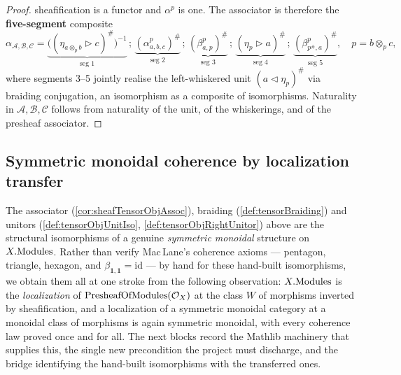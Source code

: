 \begin{proof}
  sheafification is a functor and \(\alpha^p\) is one. The associator is therefore
  the \textbf{five-segment} composite
  \[
    \alpha_{\mathcal{A},\mathcal{B},\mathcal{C}}
      = \underbrace{\bigl((\eta_{a \otimes_p b} \rhd c)^{\#}\bigr)^{-1}}_{\text{seg }1}
        \,;\, \underbrace{(\alpha^p_{a,b,c})^{\#}}_{\text{seg }2}
        \,;\, \underbrace{(\beta^p_{a,p})^{\#}}_{\text{seg }3}
        \,;\, \underbrace{(\eta_{p} \rhd a)^{\#}}_{\text{seg }4}
        \,;\, \underbrace{(\beta^p_{p^{\#},a})^{\#}}_{\text{seg }5},
    \quad p = b \otimes_p c,
  \]
  where segments 3--5 jointly realise the left-whiskered unit
  \((a \lhd \eta_{p})^{\#}\) via braiding conjugation,
  an isomorphism as a composite of isomorphisms. Naturality in
  \(\mathcal{A}, \mathcal{B}, \mathcal{C}\) follows from naturality of the unit,
  of the whiskerings, and of the presheaf associator.
\end{proof}

\subsection{Symmetric monoidal coherence by localization transfer}
\label{sec:sgr_localized_monoidal}

The associator (\cref{cor:sheafTensorObjAssoc}), braiding (\cref{def:tensorBraiding})
and unitors (\cref{def:tensorObjUnitIso}, \cref{def:tensorObjRightUnitor}) above are
the structural isomorphisms of a genuine \emph{symmetric monoidal} structure on
\(X.\mathrm{Modules}\). Rather than verify Mac\,Lane's coherence axioms --- pentagon,
triangle, hexagon, and \(\beta_{\mathbf{1},\mathbf{1}} = \mathrm{id}\) --- by hand
for these hand-built isomorphisms, we obtain them all at one stroke from the
following observation: \(X.\mathrm{Modules}\) is the \emph{localization} of
\(\mathrm{PresheafOfModules}(\mathcal{O}_X)\) at the class \(W\) of morphisms inverted by
sheafification, and a localization of a symmetric monoidal category at a
monoidal class of morphisms is again symmetric monoidal, with every coherence law
proved once and for all. The next blocks record the Mathlib machinery that supplies
this, the single new precondition the project must discharge, and the bridge
identifying the hand-built isomorphisms with the transferred ones.

